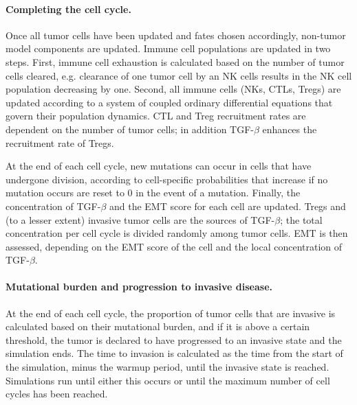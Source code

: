 \documentclass[11pt]{article}
\begin{document}
\paragraph{Completing the cell cycle.}
Once all tumor cells have been updated and fates chosen accordingly, non-tumor model components are updated. Immune cell populations are updated in two steps. First, immune cell exhaustion is calculated based on the number of tumor cells cleared, e.g. clearance of one tumor cell by an NK cells results in the NK cell population decreasing by one. Second, all immune cells (NKs, CTLs, Tregs) are updated according to a system of coupled ordinary differential equations that govern their population dynamics. CTL and Treg recruitment rates are dependent on the number of tumor cells; in addition  TGF-$\beta$ enhances the recruitment rate of Tregs.
\par
At the end of each cell cycle, new mutations can occur in cells that have undergone division, according to cell-specific probabilities that increase if no mutation occurs are reset to 0 in the event of a mutation. Finally, the concentration of TGF-$\beta$ and the EMT score for each cell are updated. Tregs and (to a lesser extent) invasive tumor cells are the sources of TGF-$\beta$; the total concentration per cell cycle is divided randomly among tumor cells. EMT is then assessed, depending on the EMT score of the cell and the local concentration of TGF-$\beta$.

\paragraph{Mutational burden and progression to invasive disease.}
At the end of each cell cycle, the proportion of tumor cells that are invasive is calculated based on their mutational burden, and if it is above a certain threshold, the tumor is declared to have progressed to an invasive state and the simulation ends. The time to invasion is calculated as the time from the start of the simulation, minus the warmup period, until the invasive state is reached. Simulations run until either this occurs or until the maximum number of cell cycles has been reached.
\end{document}
